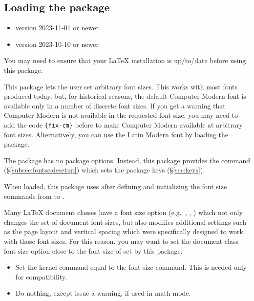 \documentclass{beery}
\begin{document}
\subsection{Loading the package}
\label{subsec:loading}

\begin{itemize}
  \item \LaTeXe{} version 2023-11-01 or newer
  \item {} version 2023-10-10 or newer
\end{itemize}

You may need to ensure that your \LaTeX{} installation is up\-/to\-/date before using this package.

This package lets the user set arbitrary font sizes.
This works with most fonts produced today, but, for historical reasons, the default Computer Modern font is available only in a number of discrete font sizes.
If you get a warning that Computer Modern is not available in the requested font size, you may need to add the code \allowbreak\verb|{fix-cm}| before  to make Computer Modern available at arbitrary font sizes.
Alternatively, you can use the Latin Modern font by loading the  package.

The  package has no package options.
Instead, this package provides the command  (\S\ref{subsec:fontscalesetup}) which sets the package keys (\S\ref{sec:keys}).

When loaded, this package uses  after defining and initializing the font size commands from  to .

Many \LaTeX{} document classes have a font size option (e.g.\ \Key{10pt}, \Key{11pt}, \Key{12pt}) which not only changes the set of document font sizes, but also modifies additional settings such as the page layout and vertical spacing which were specifically designed to work with those font sizes.
For this reason, you may want to set the document class font size option close to the font size of  set by this package.

\begin{itemize}
  \item
  Set the kernel command  equal to the font size command.
  This is needed only for compatibility.
  \item
  Do nothing, except issue a warning, if used in math mode.
\end{itemize}
\end{document}
